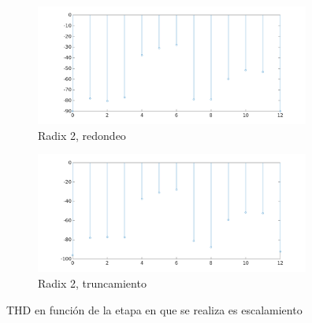 \begin{figure}[htbp!]
        \advance\leftskip-1.5cm
        \begin{subfigure}{0.6\textwidth}%
        \includegraphics[width=9cm]{./figures/r2_16_4096_mul_scale_thd_red.png}
        \caption{Radix 2, redondeo}
        \end{subfigure}%
        \begin{subfigure}{0.6\textwidth}%
        \includegraphics[width=9cm]{./figures/r2_16_4096_mul_scale_thd_trunc.png}
        \caption{Radix 2, truncamiento}
        \end{subfigure}%
	    \caption{THD en función de la etapa en que se realiza es escalamiento}	    
        \label{fig:escTHD_1}
\end{figure}

